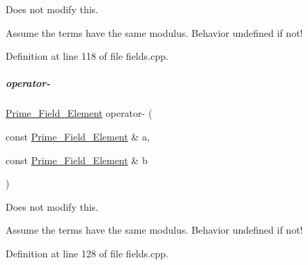 Does not modify {\ttfamily this}. 

Assume the terms have the same modulus. Behavior undefined if not! 

Definition at line 118 of file fields.\+cpp.

\mbox{\label{group___fields_group_aa87409f200d39343529ab443cd496b31}} 
\subparagraph{\texorpdfstring{operator-\/}{operator-}}
{\footnotesize\ttfamily \hyperlink{group___fields_group_class_prime___field___element}{Prime\+\_\+\+Field\+\_\+\+Element} operator-\/ (\begin{DoxyParamCaption}\item[{const \hyperlink{group___fields_group_class_prime___field___element}{Prime\+\_\+\+Field\+\_\+\+Element} \&}]{a,  }\item[{const \hyperlink{group___fields_group_class_prime___field___element}{Prime\+\_\+\+Field\+\_\+\+Element} \&}]{b }\end{DoxyParamCaption})\hspace{0.3cm}{\ttfamily [friend]}}



Does not modify {\ttfamily this}. 

Assume the terms have the same modulus. Behavior undefined if not! 

Definition at line 128 of file fields.\+cpp.


